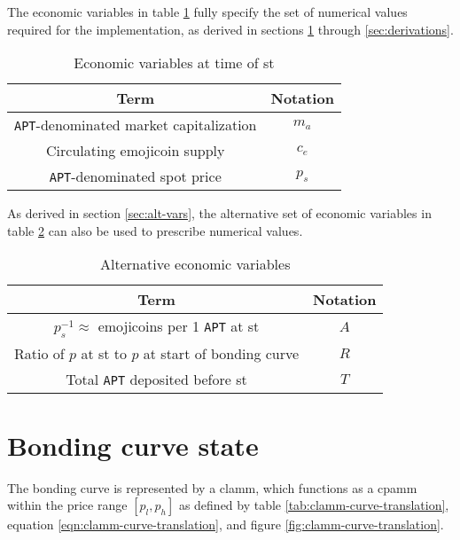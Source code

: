 \documentclass[table, twocolumn]{article}
\begin{document}
The economic variables in table \ref{tab:state-model-variables} fully specify the set of
numerical values required for the implementation, as derived in sections
\ref{sec:bonding-curve} through \ref{sec:derivations}.

\begin{table}[!htb]
  \centering
  \begin{tabular}{|c|c|}
    \hline \rowcolor{blue}
    Term                                           & Notation \\ \hline
    \texttt{APT}-denominated market capitalization & $m_a$    \\ \hline
    Circulating emojicoin supply                   & $c_e$    \\ \hline
    \texttt{APT}-denominated spot price            & $p_s$    \\ \hline
  \end{tabular}
  \caption{Economic variables at time of \gls*{st}}
  \label{tab:state-model-variables}
\end{table}

As derived in section \ref{sec:alt-vars}, the alternative set of economic variables
in table \ref{tab:state-model-variables-alt} can also be used to prescribe numerical
values.

\begin{table}[!htb]
  \centering
  \begin{tabular}{|c|c|}
    \hline \rowcolor{blue}
    Term                                           & Notation \\ \hline
    $p_s^{-1} \approx$ emojicoins per 1 \texttt{APT} at \gls*{st} & $A$    \\ \hline
    Ratio of $p$ at \gls*{st} to $p$ at start of bonding curve& $R$    \\ \hline
    Total \texttt{APT} deposited before \gls*{st}       & $T$    \\ \hline
  \end{tabular}
  \caption{Alternative economic variables}
  \label{tab:state-model-variables-alt}
\end{table}

\section{Bonding curve state} \label{sec:bonding-curve}

The bonding curve is represented by a \gls*{clamm}, which functions as a \gls*{cpamm}
within the price range $[p_l, p_h]$ as defined by table
\ref{tab:clamm-curve-translation}, equation \ref{eqn:clamm-curve-translation}, and
figure \ref{fig:clamm-curve-translation}.
\end{document}
